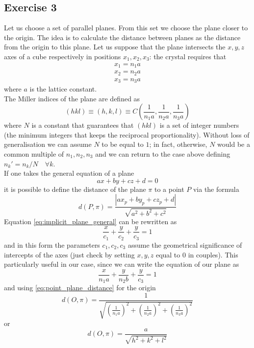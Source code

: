 \subsection*{Exercise 3}
Let us choose a set of parallel planes. From this set we choose the plane closer to the origin. The idea is to calculate the distance between planes as the distance from the origin to this plane. Let us suppose that the plane intersects the $x,y,z$ axes of a cube respectively in positions $x_1, x_2, x_3$: the crystal requires that 
\begin{gather*} 
    x_1 = n_1 a \\
    x_2 = n_2 a \\
    x_3 = n_3 a
\end{gather*}
where $a$ is the lattice constant. \\
The Miller indices of the plane are defined as 
$$(hkl) \equiv (h, k, l) \equiv C \left(\frac{1}{n_1 a}, \frac{1}{n_2 a}, \frac{1}{n_3 a}\right)$$
where $N$ is a constant that guarantees that $(hkl)$ is a set of integer numbers (the minimum integers that keeps the reciprocal proportionality). Without loss of generalisation we can assume $N$ to be equal to $1$; in fact, otherwise, $N$ would be a common multiple of $n_1, n_2, n_3$ and we can return to the case above defining $n_k' = n_k/N \quad \forall k$. \\
If one takes the general equation of a plane
\begin{equation*} 
    ax + by + cz + d = 0
    \label{eq:implicit_plane_general}
\end{equation*}
it is possible to define the distance of the plane $\pi$ to a point $P$ via the formula
\begin{equation} 
    d(P, \pi) = \frac{|ax_p + by_p + cz_p + d|}{\sqrt{a^2 + b^2 + c^2}}
    \label{eq:point_plane_distance}
\end{equation}
Equation \ref{eq:implicit_plane_general} can be rewritten as
\begin{equation}
    \frac{x}{c_1} + \frac{y}{c_2} + \frac{y}{c_3} = 1
\end{equation}
and in this form the parameters $c_1, c_2, c_3$ assume the geometrical significance of intercepts of the axes (just check by setting $x,y,z$ equal to $0$ in couples). This particularly useful in our case, since we can write the equation of our plane as
\begin{equation*}
    \frac{x}{n_1 a} + \frac{y}{n_2 b} + \frac{y}{c_3} = 1
\end{equation*}
and using \ref{eq:point_plane_distance} for the origin 
$$d(O, \pi) = \frac{1}{\sqrt{(\frac{1}{n_1 a})^2 + (\frac{1}{n_2 a})^2 + (\frac{1}{n_3 a})^2}}$$
or
$$d(O, \pi) = \frac{a}{\sqrt{h^2 + k^2 + l^2}}$$

